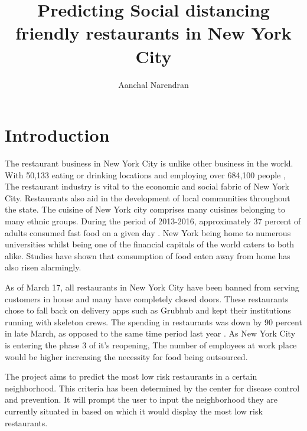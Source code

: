 \documentclass[11pt]{article}
\title{Predicting Social distancing friendly restaurants in New York City}
\author{Aanchal Narendran}
\makeatletter
\let\inserttitle\@title
\let\insertauthor\@author
\makeatother
\begin{document}
\begin{center}
  \LARGE{\inserttitle}

  \Large{\insertauthor}
\end{center}

\section{Introduction}

\par 
The restaurant business in New York City is unlike other business in the world. With 50,133 eating or drinking locations \cite{restaurants_statistics} and employing over 684,100 people \cite{restaurants_statistics} , The restaurant industry is vital to the economic and social fabric of New York City. Restaurants also aid in the development of local communities throughout the state. The cuisine of New York city comprises many cuisines belonging to many ethnic groups. During the period of 2013-2016, approximately 37 percent of adults consumed fast food on a given day \cite{fastfood_percent:paper}. New York being home to numerous universities whilst being one of the financial capitals of the world caters to both alike. Studies have shown that consumption of food eaten away from home has also risen alarmingly. 
\par As of March 17, all restaurants in New York City have been banned from serving customers in house and many have completely closed doors. These restaurants chose to fall back on delivery apps such as Grubhub and kept their institutions running with skeleton crews. The spending in restaurants was down by 90 percent in late March, as opposed to the same time period last year \cite{NewYorkBudget:paper}. As New York City is entering the phase 3 of it's reopening, The number of employees at work place would be higher increasing the necessity for food being outsourced. 
\par The project aims to predict the most low risk restaurants in a certain neighborhood. This criteria has been determined by the center for disease control and prevention. It will prompt the user to input the neighborhood they are currently situated in based on which it would display the most low risk restaurants. 
\end{document}
